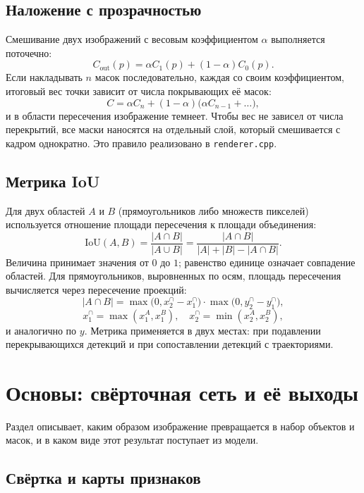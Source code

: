 \documentclass[11pt,a4paper]{article}
\theoremstyle{definition}
\theoremstyle{remark}
\begin{document}
\subsection{Наложение с прозрачностью}

Смешивание двух изображений с весовым коэффициентом $\alpha$ выполняется
поточечно:
\[
  C_{\text{out}}(p) = \alpha C_1(p) + (1-\alpha) C_0(p).
\]
Если накладывать $n$ масок последовательно, каждая со своим коэффициентом,
итоговый вес точки зависит от числа покрывающих её масок:
\[
  C = \alpha C_n + (1-\alpha)\bigl(\alpha C_{n-1} + \dots\bigr),
\]
и в области пересечения изображение темнеет. Чтобы вес не зависел от числа
перекрытий, все маски наносятся на отдельный слой, который смешивается с
кадром однократно. Это правило реализовано в \texttt{renderer.cpp}.

\subsection{Метрика IoU}

Для двух областей $A$ и $B$ (прямоугольников либо множеств пикселей)
используется отношение площади пересечения к площади объединения:
\[
  \mathrm{IoU}(A,B) = \frac{|A \cap B|}{|A \cup B|}
  = \frac{|A \cap B|}{|A| + |B| - |A \cap B|}.
\]
Величина принимает значения от $0$ до $1$; равенство единице означает
совпадение областей. Для прямоугольников, выровненных по осям, площадь
пересечения вычисляется через пересечение проекций:
\[
  |A \cap B| = \max\bigl(0, x_2^{\cap} - x_1^{\cap}\bigr)\cdot
               \max\bigl(0, y_2^{\cap} - y_1^{\cap}\bigr),
\]
\[
  x_1^{\cap} = \max(x_1^A, x_1^B), \quad x_2^{\cap} = \min(x_2^A, x_2^B),
\]
и аналогично по $y$. Метрика применяется в двух местах: при подавлении
перекрывающихся детекций и при сопоставлении детекций с траекториями.

\section{Основы: свёрточная сеть и её выходы}
\label{sec:found-cnn}

Раздел описывает, каким образом изображение превращается в набор объектов и
масок, и в каком виде этот результат поступает из модели.

\subsection{Свёртка и карты признаков}
\end{document}

